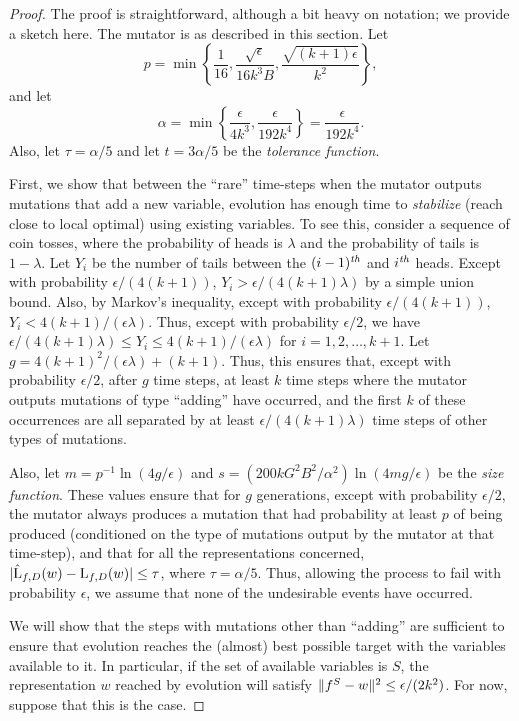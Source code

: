 \begin{proof} The proof is straightforward, although a bit heavy on notation; we
provide a sketch here. The mutator is as described in this section. Let
\[ p = \min \left\{ \frac{1}{16}, \frac{\sqrt{\epsilon}}{16k^3 B},
\frac{\sqrt{(k+1)\epsilon}}{k^2} \right\}, \]
and let
\[ \alpha = \min \left\{ \frac{\epsilon}{4k^3}, \frac{\epsilon}{192k^4} \right\}
= \frac{\epsilon}{192k^4}. \]
Also, let $\tau = \alpha/5$ and let $t = 3\alpha/5$ be the \emph{tolerance
function}.

First, we show that between the ``rare'' time-steps when the mutator outputs
mutations that add a new variable, evolution has enough time to \emph{stabilize}
(reach close to local optimal) using existing variables. To see this, consider a
sequence of coin tosses, where the probability of heads is $\lambda$ and the
probability of tails is $1 - \lambda$. Let $Y_i$ be the number of tails between
the $(i-1){^{\textit{th}}}$ and $i{^{\textit{th}}}$ heads. Except with probability $\epsilon/(4(k+1))$,
$Y_i > \epsilon/(4(k+1)\lambda)$ by a simple union bound.  Also, by Markov's
inequality, except with probability $\epsilon/(4(k+1))$, $Y_i <
4(k+1)/(\epsilon\lambda)$. Thus, except with probability $\epsilon/2$, we have
$\epsilon/(4(k+1)\lambda) \leq Y_i \leq 4(k+1)/(\epsilon\lambda)$ for $i = 1, 2,
\ldots, k+1$. Let $g = 4(k+1)^2/(\epsilon\lambda) + (k+1)$. Thus, this ensures
that, except with probability $\epsilon/2$, after $g$ time steps, at least $k$
time steps where the mutator outputs mutations of type ``adding'' have occurred,
and the first $k$ of these occurrences are all separated by at least
$\epsilon/(4(k+1) \lambda)$ time steps of other types of mutations.

Also, let $m = p^{-1}\ln(4g/\epsilon)$ and $s = (200 kG^2B^2/\alpha^2)
\ln(4mg/\epsilon)$ be the \emph{size function}.  These values ensure that for
$g$ generations, except with probability $\epsilon/2$, the mutator always
produces a mutation that had probability at least $p$ of being produced
(conditioned on the type of mutations output by the mutator at that time-step),
and that for all the representations concerned, $|\hat{\mathrm{L}}_{f, D}(w) -
\mathrm{L}_{f, D}(w)| \leq \tau$, where $\tau = \alpha/5$. Thus, allowing the process
to fail with probability $\epsilon$, we assume that none of the undesirable
events have occurred.

We will show that the steps with mutations other than ``adding'' are sufficient
to ensure that evolution reaches the (almost) best possible target with the
variables available to it. In particular, if the set of available variables is
$S$, the representation $w$ reached by evolution will satisfy $\Vert f^S -
w \Vert^2 \leq \epsilon/(2k^2)$. For now, suppose that this is the case. 


\end{proof}
